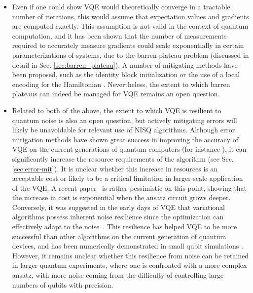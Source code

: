 \begin{itemize}
    \item Even if one could show VQE would theoretically converge in a tractable number of iterations, this would assume that expectation values and gradients are computed exactly. This assumption is not valid in the context of quantum computation, and it has been shown that the number of measurements required to accurately measure gradients could scale exponentially in certain parameterizations of systems, due to the barren plateau problem  \cite{McClean2018} (discussed in detail in Sec. \ref{sec:barren_plateau}). A number of mitigating methods have been proposed, such as the identity block initialization \cite{Grant2019} or the use of a local encoding for the Hamiltonian \cite{Cerezo2021_BP, Uvarov2020}. Nevertheless, the extent to which barren plateaus can indeed be managed for VQE remains an open question. 
    \item Related to both of the above, the extent to which VQE is resilient to quantum noise is also an open question, but actively mitigating errors will likely be unavoidable for relevant use of NISQ algorithms. Although error mitigation methods have shown great success in improving the accuracy of VQE on the current generations of quantum computers (for instance \cite{Barron2020, Sagastizabal2019, Nam2020, Arute2020, Tilly2021, Benfenati2021}), it can significantly increase the resource requirements of the algorithm (see Sec. \ref{sec:error-mit}). It is unclear whether this increase in resources is an acceptable cost or likely to be a critical limitation in larger-scale application of the VQE. A recent paper~\cite{RyujiFundamentalLimits2021} is rather pessimistic on this point, showing that the increase in cost is exponential when the ansatz circuit grows deeper. Conversely, it was suggested in the early days of VQE that variational algorithms possess inherent noise resilience since the optimization can effectively adapt to the noise~\cite{mccleanTheoryVariationalHybrid2015}. This resilience has helped VQE to be more successful than other algorithms on the current generation of quantum devices, and has been numerically demonstrated in small qubit simulations \cite{Enrico2021EvaluatingNoiseResilience}. However, it remains unclear whether this resilience from noise can be retained in larger quantum experiments, where one is confronted with a more complex ansatz, with more noise coming from the difficulty of controlling large numbers of qubits with precision.
\end{itemize}

